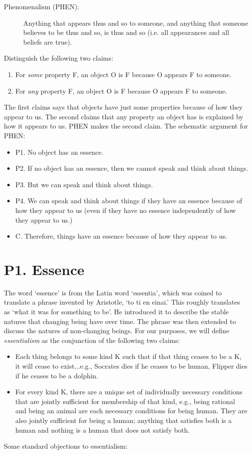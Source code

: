 \documentclass[article,oneside]{memoir}
\begin{document}
\begin{description}
\item[Phenomenalism (PHEN):] Anything that appears thus and so to someone, and anything that someone believes to be thus and so, is thus and so (i.e. all appearances and all beliefs are true).
\end{description}
Distinguish the following two claims:


\begin{enumerate}
\item For \emph{some} property F, an object O is F because O appears F to someone. 
\item For \emph{any} property F,  an object O is F because O appears F to someone. 
\end{enumerate}
The first claims says that objects have just some properties because of how they appear to us. The second claims that any property an object has is explained by how it appears to us. PHEN makes the second claim. The schematic argument for PHEN:
\begin{itemize}
\item P1. No object has an essence.  
\item P2. If no object has an essence, then we cannot speak and think about things. 
\item P3. But we can speak and think about things. 
\item P4. We can speak and think about things if they have an essence because of how they appear to us (even if they have no essence independently of how they appear to us.) 
\item C. Therefore, things have an essence because of how they appear to us.  
\end{itemize}

\section{P1. Essence}

The word `essence'  is from the Latin word `essentia', which was coined to translate a phrase invented by Aristotle, `to ti en einai.' This roughly translates as `what it was for something to be'. He introduced it to describe the stable natures that changing being have over time. The phrase was then extended to discuss the natures of non-changing beings. For our purposes, we will define \emph{essentialism} as the conjunction of the following two claims:
\begin{itemize}
\item Each thing belongs to some kind K such that if that thing ceases to be a K, it will cease to exist...e.g., Socrates dies if he ceases to be human, Flipper dies if he ceases to be a dolphin. 
\item For every kind K, there are a unique set of individually necessary conditions that are jointly sufficient for membership of that kind, e.g., being rational and being an animal are each necessary conditions for being human. They are also jointly sufficient for being a human; anything that satisfies both is a human and nothing is a human that does not satisfy both. 
\end{itemize}
Some standard objections to essentialism: 
\end{document}
